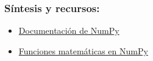 \documentclass{beamer}
\begin{document}
\begin{frame}
\frametitle{Síntesis y recursos:}

\begin{itemize}
\item \href{https://numpy.org/doc/stable/}{Documentación de NumPy}
\item \href{https://numpy.org/doc/stable/reference/routines.math.html}{Funciones matemáticas en NumPy}

\end{itemize}
\end{frame}
\end{document}
